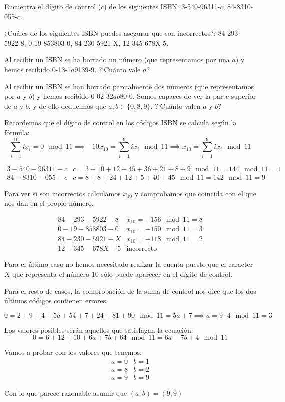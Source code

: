 \begin{problem}[2]
\ppart Encuentra el dígito de control ($c$) de los
siguientes ISBN:
 3-540-96311-$c$, 84-8310-055-$c$.

\ppart ¿Cuáles de los siguientes ISBN puedes asegurar que son
incorrectos?: 84-293-5922-8, 0-19-853803-0,  84-230-5921-X,
12-345-678X-5.

\ppart Al recibir un ISBN se ha borrado un número (que representamos
por una $a$) y hemos recibido 0-13-1$a$9139-9. ?`Cuánto vale $a$?

\ppart Al recibir un ISBN se han borrado parcialmente dos números (que
representamos por $a$ y $b$) y hemos recibido 0-02-32$ab$80-0.
Somos capaces de ver la parte superior de $a$ y $b$, y de ello
deducimos que $a,b\in\{0,8,9\}$. ?`Cuánto valen $a$ y $b$?
\solution


\spart

Recordemos que el dígito de control en los códigos ISBN se calcula según la fórmula:
\[\sum_{i=1}^{10}ix_i = 0 \mod 11 \implies -10 x_{10} = \sum_{i=1}^9ix_i \mod 11 \implies x_{10} = \sum_{i=1}^9ix_i \mod 11\]

\[\begin{array}{ll}
3-540-96311-c & c = 3+10+12+45+36+21+8+9\mod 11 = 144 \mod 11 = 1\\
84-8310-055-c & c = 8+8+24+12+5+40+45 \mod 11 = 142 \mod 11 = 9
\end{array}\]

\spart

Para ver si son incorrectos calculamos $x_{10}$ y comprobamos que coincida con el que nos dan en el propio número.

\[\begin{array}{ll}
84-293-5922-8 & x_{10} = -156 \mod 11 = 8 \\
0-19-853803-0 & x_{10} = -150 \mod 11 = 3 \\
84-230-5921-X & x_{10} = -118 \mod 11 = 2 \\
12-345-678X-5 & \text{incorrecto}
\end{array}\]

Para el último caso no hemos necesitado realizar la cuenta puesto que el caracter $X$ que representa el número 10 sólo puede aparecer en el dígito de control.

Para el resto de casos, la comprobación de la suma de control nos dice que los dos últimos códigos contienen errores.

\spart

\[0 = 2+9+4+5a+54+7+24+81+90 \mod 11 = 5a+7 \implies a = 9\cdot 4 \mod 11 = 3\]

\spart
Los valores posibles serán aquellos que satisfagan la ecuación:
\[0 = 6+12+10+6a+7b+64 \mod 11 = 6a+7b+4 \mod 11\]

Vamos a probar con los valores que tenemos:
\[\begin{array}{ll}
a= 0 & b= 1 \\
a=8 & b=2 \\
a=9 & b=9
\end{array}\]

Con lo que parece razonable asumir que $(a,b)=(9,9)$
\end{problem}

